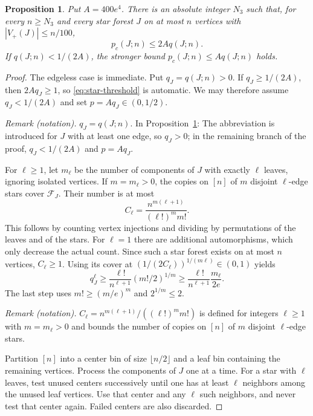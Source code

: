 \documentclass[11pt]{article}
\newtheorem{proposition}[theorem]{Proposition}
\theoremstyle{remark}
\numberwithin{equation}{section}
\newcommand{\calF}{\mathcal F}
\begin{document}
\begin{proposition}\label{prop:stars}
Put $A=400e^4$. There is an absolute integer $N_3$ such that,
for every $n\geq N_3$ and every star forest $J$ on at most $n$
vertices with $|V_+(J)|\leq n/100$,
\begin{equation}\label{eq:star-threshold}
 p_c(J;n)\leq2Aq(J;n).
\end{equation}
If $q(J;n)<1/(2A)$, the stronger bound
$p_c(J;n)\leq Aq(J;n)$ holds.
\end{proposition}
\begin{proof}
The edgeless case is immediate. Put $q_J=q(J;n)>0$.
If $q_J\geq1/(2A)$, then $2Aq_J\geq1$, so
\eqref{eq:star-threshold} is automatic. We may therefore
assume $q_J<1/(2A)$ and set $p=Aq_J\in(0,1/2)$.

\noindent\textit{Remark (notation).} $q_J=q(J;n)$. In Proposition~\ref{prop:stars}: The abbreviation is introduced for $J$ with at least one edge, so $q_J>0$; in the remaining branch of the proof, $q_J<1/(2A)$ and $p=Aq_J$.


For $\ell\geq1$, let $m_\ell$ be the number of components
of $J$ with exactly $\ell$ leaves, ignoring isolated vertices.
If $m=m_\ell>0$, the copies on $[n]$ of $m$ disjoint
$\ell$-edge stars cover $\calF_J$. Their number is at most
\[
 C_\ell=\frac{n^{m(\ell+1)}}{(\ell!)^m m!}.
\]
This follows by counting vertex injections and dividing by
permutations of the leaves and of the stars. For $\ell=1$
there are additional automorphisms, which only decrease the
actual count. Since such a star forest exists on at most $n$
vertices, $C_\ell\geq1$. Using its cover at
$(1/(2C_\ell))^{1/(m\ell)}\in(0,1)$ yields
\begin{equation}\label{eq:star-count}
 q_J^\ell\geq\frac{\ell!}{n^{\ell+1}}(m!/2)^{1/m}
 \geq\frac{\ell!}{n^{\ell+1}}\frac{m_\ell}{2e}.
\end{equation}
The last step uses $m!\geq(m/e)^m$ and $2^{1/m}\leq2$.

\noindent\textit{Remark (notation).} $C_\ell=n^{m(\ell+1)}/((\ell!)^m m!)$ is defined for integers $\ell\geq1$ with $m=m_\ell>0$ and bounds the number of copies on $[n]$ of $m$ disjoint $\ell$-edge stars.


Partition $[n]$ into a center bin of size $\lfloor n/2\rfloor$
and a leaf bin containing the remaining vertices. Process the
components of $J$ one at a time. For a star with $\ell$ leaves,
test unused centers successively until one has at least $\ell$
neighbors among the unused leaf vertices. Use that center and
any $\ell$ such neighbors, and never test that center again.
Failed centers are also discarded.


\end{proof}
\end{document}
